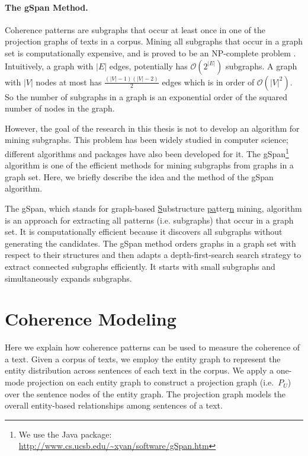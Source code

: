\paragraph{The gSpan Method.}

Coherence patterns are subgraphs that occur at least once in one of the projection graphs of texts in a corpus. 
Mining all subgraphs that occur in a graph set is computationally expensive, and is proved to be an NP-complete problem \cite{}. 
Intuitively, a graph with $|E|$ edges, potentially has $\mathcal{O} \left( 2^{| E |} \right)$ subgraphs.  
A graph with $| V |$ nodes at most has  $\frac{(| V |-1)(| V |-2)}{2}$ edges which is in order of $\mathcal{O} \left( | V | ^2 \right)$. 
So the number of subgraphs in a graph is an exponential order of the squared number of nodes in the graph. 


However, the goal of the research in this thesis is not to develop an algorithm for mining subgraphs.  
This problem has been widely studied in computer science; different algorithms and packages have also been developed for it. 
The gSpan\footnote{We use the Java package: \url{http://www.cs.ucsb.edu/~xyan/software/gSpan.htm}}  algorithm \cite{yanxifeng02} is one of the efficient methods for mining subgraphs from graphs in a graph set. 
Here, we briefly describe the idea and the method of the gSpan algorithm.  

The gSpan, which stands for \underline{g}raph-based \underline{S}ubstructure \underline{pa}tter\underline{n} mining, algorithm is an approach for extracting all patterns (i.e. subgraphs) that occur in a graph set. 
It is computationally efficient because it discovers all subgraphs without generating the candidates. 
The gSpan method orders graphs in a graph set with respect to their structures and then adapts a depth-first-search search strategy to extract connected subgraphs efficiently. 
It starts with small subgraphs and simultaneously expands subgraphs.  

\section{Coherence Modeling}
\label{sec:coh-modeling}

Here we explain how coherence patterns can be used to measure the coherence of a text. 
Given a corpus of texts, we employ the entity graph to represent the entity distribution across sentences of each text in the corpus. 
We apply a one-mode projection on each entity graph to construct a projection graph (i.e.\ $P_U$) over the sentence nodes of the entity graph. 
The projection graph models the overall entity-based relationships among sentences of a text.  

